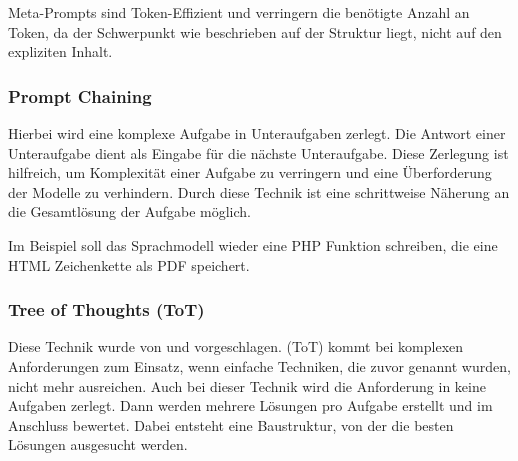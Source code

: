 

Meta-Prompts sind Token-Effizient und verringern die benötigte Anzahl an Token, da der Schwerpunkt wie beschrieben auf der Struktur liegt, nicht auf den expliziten Inhalt.


\subsubsection{Prompt Chaining}
Hierbei wird eine komplexe Aufgabe in Unteraufgaben zerlegt. Die Antwort einer Unteraufgabe dient als Eingabe für die nächste Unteraufgabe. Diese Zerlegung ist hilfreich, um Komplexität einer Aufgabe zu verringern und eine Überforderung der Modelle zu verhindern. Durch diese Technik ist eine schrittweise Näherung an die Gesamtlösung der Aufgabe möglich.\vspace{0.2cm}

Im Beispiel soll das Sprachmodell wieder eine PHP Funktion schreiben, die eine HTML Zeichenkette als PDF speichert.

















\subsubsection{Tree of Thoughts (ToT)}
Diese Technik wurde von \cite{long-2023} und \cite{yao-2023} vorgeschlagen. (\acrshort{ToT}) kommt bei komplexen Anforderungen zum Einsatz, wenn einfache Techniken, die zuvor genannt wurden, nicht mehr ausreichen. Auch bei dieser Technik wird die Anforderung in keine Aufgaben zerlegt. Dann werden mehrere Lösungen pro Aufgabe erstellt und im Anschluss bewertet. Dabei entsteht eine Baustruktur, von der die besten Lösungen ausgesucht werden.

